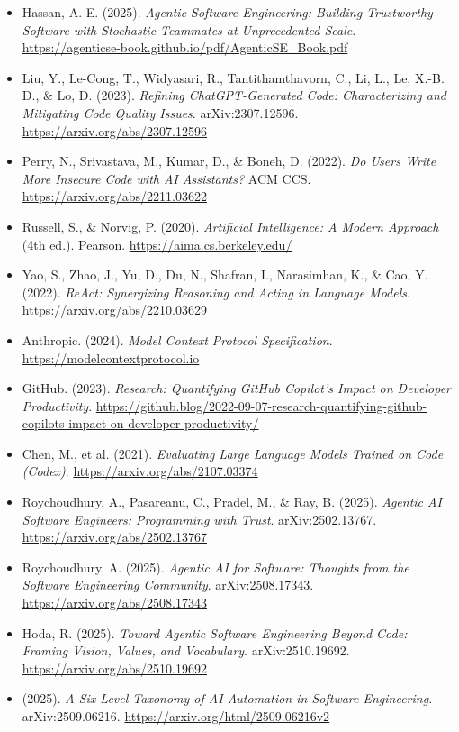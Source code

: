 \documentclass[11pt,a4paper]{book}
\begin{document}
\begin{itemize}
  \item Hassan, A. E. (2025). \textit{Agentic Software Engineering: Building Trustworthy Software with Stochastic Teammates at Unprecedented Scale}. \url{https://agenticse-book.github.io/pdf/AgenticSE\_Book.pdf}
  \item Liu, Y., Le-Cong, T., Widyasari, R., Tantithamthavorn, C., Li, L., Le, X.-B. D., \& Lo, D. (2023). \textit{Refining ChatGPT-Generated Code: Characterizing and Mitigating Code Quality Issues}. arXiv:2307.12596. \url{https://arxiv.org/abs/2307.12596}
  \item Perry, N., Srivastava, M., Kumar, D., \& Boneh, D. (2022). \textit{Do Users Write More Insecure Code with AI Assistants?} ACM CCS. \url{https://arxiv.org/abs/2211.03622}
  \item Russell, S., \& Norvig, P. (2020). \textit{Artificial Intelligence: A Modern Approach} (4th ed.). Pearson. \url{https://aima.cs.berkeley.edu/}
  \item Yao, S., Zhao, J., Yu, D., Du, N., Shafran, I., Narasimhan, K., \& Cao, Y. (2022). \textit{ReAct: Synergizing Reasoning and Acting in Language Models}. \url{https://arxiv.org/abs/2210.03629}
  \item Anthropic. (2024). \textit{Model Context Protocol Specification}. \url{https://modelcontextprotocol.io}
  \item GitHub. (2023). \textit{Research: Quantifying GitHub Copilot's Impact on Developer Productivity}. \url{https://github.blog/2022-09-07-research-quantifying-github-copilots-impact-on-developer-productivity/}
  \item Chen, M., et al. (2021). \textit{Evaluating Large Language Models Trained on Code (Codex)}. \url{https://arxiv.org/abs/2107.03374}
  \item Roychoudhury, A., Pasareanu, C., Pradel, M., \& Ray, B. (2025). \textit{Agentic AI Software Engineers: Programming with Trust}. arXiv:2502.13767. \url{https://arxiv.org/abs/2502.13767}
  \item Roychoudhury, A. (2025). \textit{Agentic AI for Software: Thoughts from the Software Engineering Community}. arXiv:2508.17343. \url{https://arxiv.org/abs/2508.17343}
  \item Hoda, R. (2025). \textit{Toward Agentic Software Engineering Beyond Code: Framing Vision, Values, and Vocabulary}. arXiv:2510.19692. \url{https://arxiv.org/abs/2510.19692}
  \item (2025). \textit{A Six-Level Taxonomy of AI Automation in Software Engineering}. arXiv:2509.06216. \url{https://arxiv.org/html/2509.06216v2}
\end{itemize}
\end{document}
